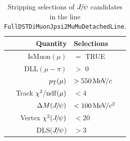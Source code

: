 \begin{table}[tbh]
\caption{Stripping selections of ${{J\mskip -3mu/\mskip -2mu\psi}}$ candidates in the line \texttt{FullDSTDiMuonJpsi2MuMuDetachedLine}.}
\centering
\begin{tabular}{rl}
\hline
Quantity               & Selections \\
\hline
IsMuon$(\mu)$          & $=$ TRUE \\
DLL$(\mu-\pi)$     & $>$ 0\\
$p_{\mathrm{T}}(\mu)$             & $>550\text{\,Me\kern -0.1em V\!/}c$ \\
Track $\chi^2/\mathrm{ndf}(\mu)$ & $<4$  \\
$\Delta M({{J\mskip -3mu/\mskip -2mu\psi}})$      & $<100\text{\,Me\kern -0.1em V\!/}c^2$\\
Vertex $\chi^2({{J\mskip -3mu/\mskip -2mu\psi}})$ & $<20$ \\
DLS(${{J\mskip -3mu/\mskip -2mu\psi}}$)           & $>3$  \\
\hline
\end{tabular}
\label{tab:JpsiSelection_jpsipk}
\end{table}

